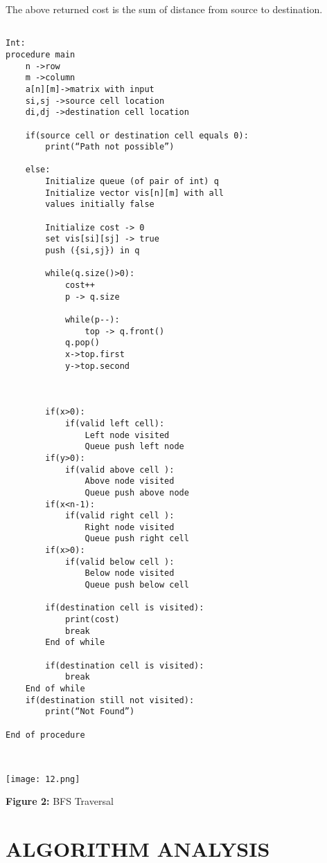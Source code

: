 \documentclass[10pt]{article}
\begin{document}
\begin{multicols*}{2}
The above returned cost is the sum of distance from source to destination.


\begin{lstlisting}
        
Int:
procedure main 
	n ->row
	m ->column
	a[n][m]->matrix with input
	si,sj ->source cell location
    di,dj ->destination cell location

    if(source cell or destination cell equals 0):
    	print(“Path not possible”)
    
    else:
    	Initialize queue (of pair of int) q
    	Initialize vector vis[n][m] with all 
    	values initially false
    	
    	Initialize cost -> 0
    	set vis[si][sj] -> true
    	push ({si,sj}) in q
    
    	while(q.size()>0):
    		cost++
    		p -> q.size
    		
    		while(p--):
    			top -> q.front()
            q.pop()
            x->top.first	
    		y->top.second
    		
    		
    			
    	if(x>0):
    		if(valid left cell):
    			Left node visited
    			Queue push left node  
    	if(y>0):
    		if(valid above cell ):
    			Above node visited
    			Queue push above node
    	if(x<n-1):
    		if(valid right cell ):
    			Right node visited
    			Queue push right cell  
    	if(x>0):
    		if(valid below cell ):
    			Below node visited
    			Queue push below cell 
    		
    	if(destination cell is visited):
    		print(cost)
    		break
    	End of while
    	
    	if(destination cell is visited):
    		break
    End of while
    if(destination still not visited):
    	print(“Not Found”)

End of procedure



\end{lstlisting}
    

	\texttt{[image: 12.png]}\begin{center}\textbf{Figure 2:} BFS Traversal \end{center}

\section*{ALGORITHM ANALYSIS} 
	

\end{multicols*}
\end{document}
